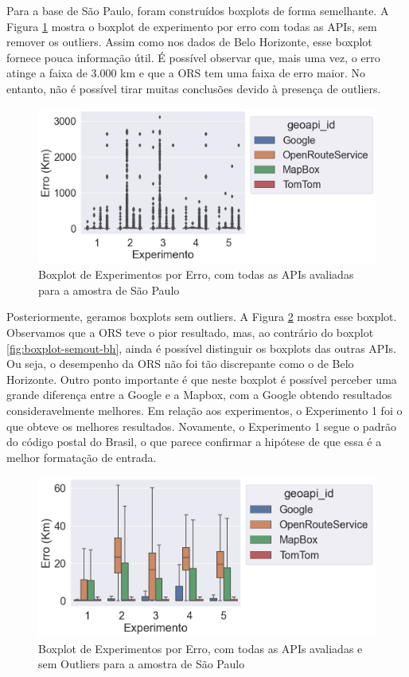 Para a base de São Paulo, foram construídos boxplots de forma semelhante. A Figura \ref{fig:boxplot-completo-sp} mostra o boxplot de experimento por erro com todas as APIs, sem remover os outliers. Assim como nos dados de Belo Horizonte, esse boxplot fornece pouca informação útil. É possível observar que, mais uma vez, o erro atinge a faixa de 3.000 km e que a ORS tem uma faixa de erro maior. No entanto, não é possível tirar muitas conclusões devido à presença de outliers.

\begin{figure}[h]
    \centering
    \includegraphics[width=\textwidth]{Figuras/boxplotExperimentoSP.png}
    \caption{Boxplot de Experimentos por Erro, com todas as APIs avaliadas para a amostra de São Paulo}
    \label{fig:boxplot-completo-sp}
\end{figure}

Posteriormente, geramos boxplots sem outliers. A Figura \ref{fig:boxplot-semout-sp} mostra esse boxplot. Observamos que a ORS teve o pior resultado, mas, ao contrário do boxplot \ref{fig:boxplot-semout-bh}, ainda é possível distinguir os boxplots das outras APIs. Ou seja, o desempenho da ORS não foi tão discrepante como o de Belo Horizonte. Outro ponto importante é que neste boxplot é possível perceber uma grande diferença entre a Google e a Mapbox, com a Google obtendo resultados consideravelmente melhores. Em relação aos experimentos, o Experimento 1 foi o que obteve os melhores resultados. Novamente, o Experimento 1 segue o padrão do código postal do Brasil, o que parece confirmar a hipótese de que essa é a melhor formatação de entrada.

\begin{figure}[h]
    \centering
    \includegraphics[width=\textwidth]{Figuras/boxplotExperimentoSemOutSP.png}
    \caption{Boxplot de Experimentos por Erro, com todas as APIs avaliadas e sem Outliers para a amostra de São Paulo}
    \label{fig:boxplot-semout-sp}
\end{figure}

